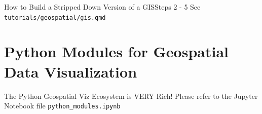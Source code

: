 \documentclass[show notes, aspectratio=1610]{beamer}
\begin{document}
\begin{frame}{How to Build a Stripped Down Version of a GIS}{Steps 2 - 5}
	\centering
	\Large
	See \texttt{tutorials/geospatial/gis.qmd}
\end{frame}

\section{Python Modules for Geospatial Data Visualization}

\begin{frame}{The Python Geospatial Viz Ecosystem is VERY Rich!}{}
	\centering
	\Large
	Please refer to the Jupyter Notebook file \texttt{python\_modules.ipynb}
\end{frame}


\end{document}
